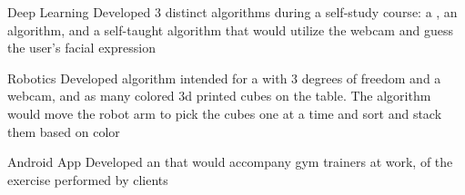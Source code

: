 

\begin{cvskills}

\cvskill
  {Deep Learning} %
  {Developed 3 distinct  algorithms during a self-study course: a , an  algorithm, and a self-taught  algorithm that would utilize the webcam and guess the user's facial expression} %

\cvskill
  {Robotics} %
  {Developed algorithm intended for a  with 3 degrees of freedom and a webcam, and as many colored 3d printed cubes on the table. The algorithm would move the robot arm to pick the cubes one at a time and sort and stack them based on color} %

\cvskill
  {Android App} %
  {Developed an  that would accompany gym trainers at work,  of the exercise performed by clients} %

\end{cvskills}

